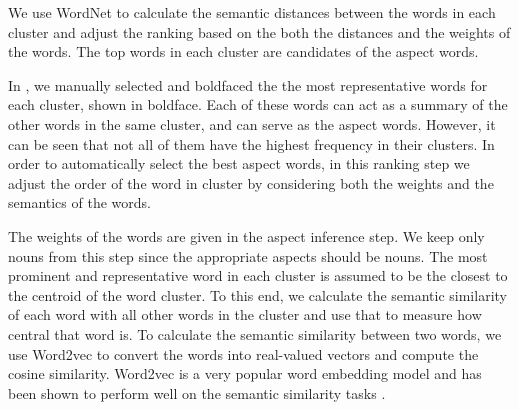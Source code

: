 
We use WordNet to calculate the semantic distances between the words 
in each cluster and adjust the ranking based on the 
both the distances and the weights of the words. The top words in each
cluster are candidates of the aspect words.

In ,
we manually selected and boldfaced the the most representative words for
each cluster, shown in boldface.  
Each of these words can act as a summary of the 
other words in the same cluster, and can serve as the aspect words.
However, it can be seen that not all of them have the highest frequency 
in their clusters.  In order to 
automatically select the best aspect words,
in this ranking step we adjust the order of the word in cluster 
by considering both the weights and the semantics of the words.

The weights of the words are given in the aspect inference step.
We keep only nouns from this step since the appropriate aspects 
should be nouns. The most prominent and representative word in each cluster
is assumed to be the closest to the centroid of the word cluster.
To this end, we calculate the semantic similarity of each word with all other 
words in the cluster and use that to measure how central that word is.
To calculate the semantic similarity between two words, 
we use Word2vec to convert the words into real-valued vectors and 
compute the cosine similarity. Word2vec is a very popular 
word embedding model and has been shown to perform well on 
the semantic similarity tasks \cite{levy2015improving}.


